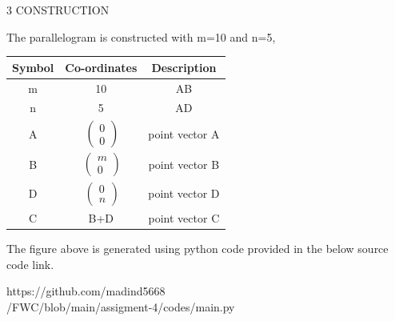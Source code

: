 \documentclass[a4paper,12pt]{report}
\begin{document}
\begin{multicols}{2}
\centering \large\textsc{3  C}\footnotesize\textsc{ONSTRUCTION}\vspace{5mm}\\
\raggedright\large{The parallelogram is constructed with m=10 and n=5,} 
\begin{center}
    \label{tab:truthtable}
    \setlength{\arrayrulewidth}{0.2mm}
\setlength{\tabcolsep}{5pt}
\renewcommand{\arraystretch}{2}
    \begin{tabular}{|c|c|c|}
    \hline %
      \large\textbf{Symbol} & \large\textbf{Co-ordinates} & \large\textbf{Description}\\
      \hline
	\large m & 10 & \large AB \\
	\large n & 5 & \large AD\\
	\large A &  $\ \begin{pmatrix} 0\\0 \end{pmatrix}$  & \large point vector A\\
	\large B &  $\ \begin{pmatrix} m\\0 \end{pmatrix}$ & \large point vector B\\
	\large D &  $\ \begin{pmatrix} 0\\n \end{pmatrix}$ & \large point vector D\\ 
        \large C & \large B+D & \large point vector C\\ 
      \hline
   \end{tabular}
 \end{center}\vspace{5mm} 


\raggedright\large{The figure above is generated using python code provided in the below source code link.}\vspace{2mm}\\
\begin{mdframed}
\raggedright\large{https://github.com/madind5668 \\ /FWC/blob/main/assigment-4/codes/main.py}
\end{mdframed}


\end{multicols}
\end{document}

